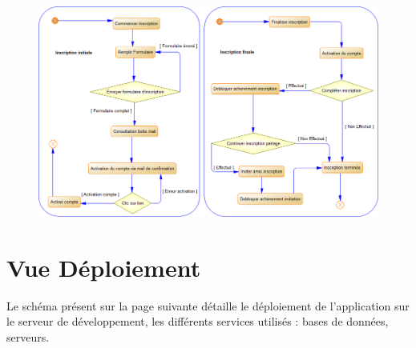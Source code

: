 \documentclass{life-fr}
\begin{document}
\begin{figure}[H]
  \begin{center}
    \includegraphics[width=17cm]{img/processus_detailles.png}
  \end{center}
\end{figure}


\chapter{Vue Déploiement}

Le schéma présent sur la page suivante détaille le déploiement de l'application sur le serveur de développement, les différents services utilisés : bases de données, serveurs.

\newpage
\end{document}
